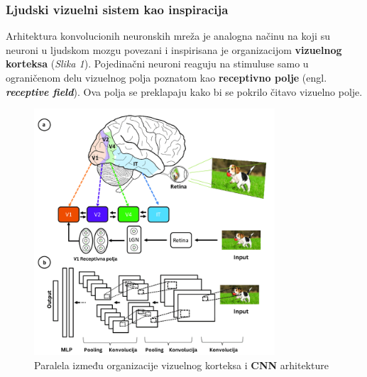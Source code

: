 \documentclass[12pt]{article}
\begin{document}
   \subsubsection{Ljudski vizuelni sistem kao inspiracija}
   Arhitektura konvolucionih neuronskih mreža je analogna načinu na koji su neuroni u
   ljudskom mozgu povezani i inspirisana je organizacijom \textbf{vizuelnog korteksa} (\textit{Slika 1}). 
   Pojedinačni neuroni reaguju na stimuluse samo u ograničenom delu vizuelnog polja 
   poznatom kao \textbf{receptivno polje} (engl. \textbf{\textit{receptive field}}). 
   Ova polja se preklapaju kako bi se pokrilo čitavo vizuelno polje.


   \begin{figure}[h!]
      \centering
      \vspace{1.5cm} %
      \includegraphics[width=0.8\textwidth]{visual_cortex.png}
      \caption{Paralela između organizacije vizuelnog korteksa i \textbf{CNN} arhitekture}
      \label{fig:visual_cortex}
   \end{figure}

   \newpage
\end{document}
